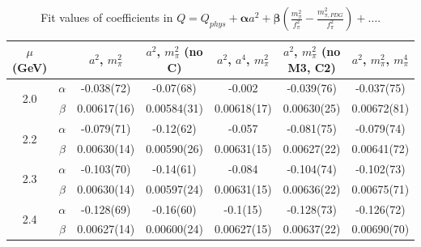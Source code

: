 \documentclass[12pt]{extarticle}
\begin{document}
\begin{table}[h!]
\begin{center}
\begin{tabular}{|c c|c|c|c|c|c|}
\hline
$\mu$ (GeV) &  & $a^2$, $m_\pi^2$& $a^2$, $m_\pi^2$ (no C)& $a^2$, $a^4$, $m_\pi^2$& $a^2$, $m_\pi^2$ (no M3, C2)& $a^2$, $m_\pi^2$, $m_\pi^4$\\
\hline
\multirow{2}{0.5in}{2.0} & $\alpha$ & -0.038(72)& -0.07(68)& -0.002& -0.039(76)& -0.037(75)\\
 & $\beta$ & 0.00617(16)& 0.00584(31)& 0.00618(17)& 0.00630(25)& 0.00672(81)\\
\hline
\multirow{2}{0.5in}{2.2} & $\alpha$ & -0.079(71)& -0.12(62)& -0.057& -0.081(75)& -0.079(74)\\
 & $\beta$ & 0.00630(14)& 0.00590(26)& 0.00631(15)& 0.00627(22)& 0.00641(72)\\
\hline
\multirow{2}{0.5in}{2.3} & $\alpha$ & -0.103(70)& -0.14(61)& -0.084& -0.104(74)& -0.102(73)\\
 & $\beta$ & 0.00630(14)& 0.00597(24)& 0.00631(15)& 0.00636(22)& 0.00675(71)\\
\hline
\multirow{2}{0.5in}{2.4} & $\alpha$ & -0.128(69)& -0.16(60)& -0.1(15)& -0.128(73)& -0.126(72)\\
 & $\beta$ & 0.00627(14)& 0.00600(24)& 0.00627(15)& 0.00637(22)& 0.00690(70)\\
\hline
\end{tabular}
\caption{Fit values of coefficients in $Q = Q_{phys} + \mathbf{\alpha} a^2 + \mathbf{\beta}\left(\frac{m_\pi^2}{f_\pi^2}-\frac{m_{\pi,PDG}^2}{f_\pi^2}\right) + \ldots$.}
\end{center}
\end{table}




















\clearpage
\end{document}
